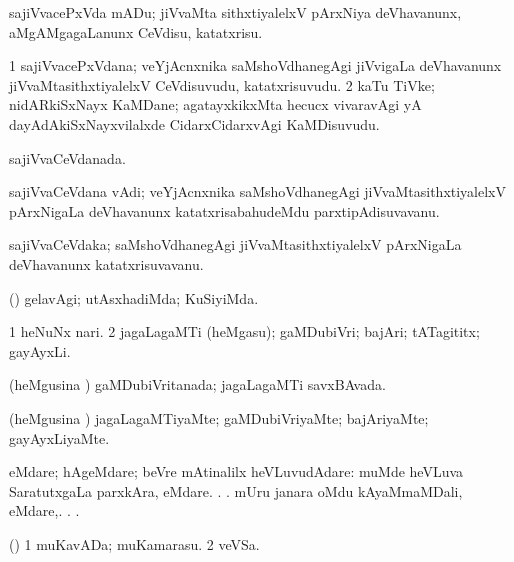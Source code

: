 \bentry
{} 
\gl{\akirx}
\expl{}
\bmng
 sajiVvacePxVda mADu; jiVvaMta sithxtiyalelxV pArxNiya deVhavanunx, aMgAMgagaLanunx CeVdisu, katatxrisu. 
\emng
\eentry

\bentry 
{} 
\gl{\nA}
\expl{}
\bmng
\bnum
\num{1} sajiVvacePxVdana; veYjAcnxnika saMshoVdhanegAgi jiVvigaLa deVhavanunx jiVvaMtasithxtiyalelxV CeVdisuvudu, katatxrisuvudu. 
\num{2} kaTu TiVke; nidARkiSxNayx KaMDane; agatayxkikxMta hecucx vivaravAgi yA dayAdAkiSxNayxvilalxde CidarxCidarxvAgi KaMDisuvudu. 
\enum
\emng
\eentry

\bentry 
{} 
\gl{\gu}
\expl{}
\bmng
 sajiVvaCeVdanada. 
\emng
\eentry

\bentry 
{} 
\gl{\nA}
\expl{}
\bmng
 sajiVvaCeVdana vAdi; veYjAcnxnika saMshoVdhanegAgi jiVvaMtasithxtiyalelxV pArxNigaLa deVhavanunx katatxrisabahudeMdu parxtipAdisuvavanu. 
\emng
\eentry

\bentry
{} 
\gl{\nA}
\expl{}
\bmng
 sajiVvaCeVdaka; saMshoVdhanegAgi jiVvaMtasithxtiyalelxV pArxNigaLa deVhavanunx katatxrisuvavanu. 
\emng
\eentry

\bentry 
{} 
\gl{\kirxvi}
\expl{}
\bmng
 (\saM) gelavAgi; utAsxhadiMda; KuSiyiMda. 
\emng
\eentry

\bentry
{} 
\gl{\nA}
\expl{}
\bmng
\bnum
\num{1} heNuNx nari. 
\num{2} jagaLagaMTi (heMgasu); gaMDubiVri; bajAri; tATagititx; gayAyxLi. 
\enum
\emng
\eentry

\bentry
{} 
\gl{\gu}
\expl{}
\bmng
 (heMgusina \vi) gaMDubiVritanada; jagaLagaMTi savxBAvada. 
\emng
\eentry

\bentry 
{} 
\gl{\kirxvi}
\expl{}
\bmng
 (heMgusina \vi) jagaLagaMTiyaMte; gaMDubiVriyaMte; bajAriyaMte; gayAyxLiyaMte. 
\emng
\eentry

\bentry 
{} 
\gl{\kirxvi}
\expl{}
\bmng
 eMdare; hAgeMdare; beVre mAtinalilx heVLuvudAdare:  muMde heVLuva SaratutxgaLa parxkAra, eMdare. . .  mUru janara oMdu kAyaMmaMDali, eMdare,. . . 
\emng
\eentry

\bentry 
{} 
\gl{\nA}
\expl{}
\bmng
 (\pArxparx) 
\bnum
\num{1} muKavADa; muKamarasu. 
\num{2} veVSa. 
\enum
\emng
\eentry

